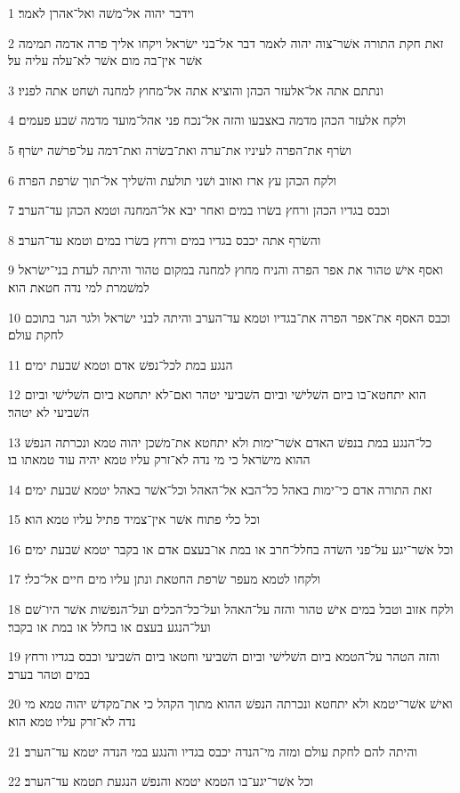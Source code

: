 \par 1 וידבר יהוה אל־משׁה ואל־אהרן לאמר׃
\par 2 זאת חקת התורה אשׁר־צוה יהוה לאמר דבר אל־בני ישׂראל ויקחו אליך פרה אדמה תמימה אשׁר אין־בה מום אשׁר לא־עלה עליה על׃
\par 3 ונתתם אתה אל־אלעזר הכהן והוציא אתה אל־מחוץ למחנה ושׁחט אתה לפניו׃
\par 4 ולקח אלעזר הכהן מדמה באצבעו והזה אל־נכח פני אהל־מועד מדמה שׁבע פעמים׃
\par 5 ושׂרף את־הפרה לעיניו את־ערה ואת־בשׂרה ואת־דמה על־פרשׁה ישׂרף׃
\par 6 ולקח הכהן עץ ארז ואזוב ושׁני תולעת והשׁליך אל־תוך שׂרפת הפרה׃
\par 7 וכבס בגדיו הכהן ורחץ בשׂרו במים ואחר יבא אל־המחנה וטמא הכהן עד־הערב׃
\par 8 והשׂרף אתה יכבס בגדיו במים ורחץ בשׂרו במים וטמא עד־הערב׃
\par 9 ואסף אישׁ טהור את אפר הפרה והניח מחוץ למחנה במקום טהור והיתה לעדת בני־ישׂראל למשׁמרת למי נדה חטאת הוא׃
\par 10 וכבס האסף את־אפר הפרה את־בגדיו וטמא עד־הערב והיתה לבני ישׂראל ולגר הגר בתוכם לחקת עולם׃
\par 11 הנגע במת לכל־נפשׁ אדם וטמא שׁבעת ימים׃
\par 12 הוא יתחטא־בו ביום השׁלישׁי וביום השׁביעי יטהר ואם־לא יתחטא ביום השׁלישׁי וביום השׁביעי לא יטהר׃
\par 13 כל־הנגע במת בנפשׁ האדם אשׁר־ימות ולא יתחטא את־משׁכן יהוה טמא ונכרתה הנפשׁ ההוא מישׂראל כי מי נדה לא־זרק עליו טמא יהיה עוד טמאתו בו׃
\par 14 זאת התורה אדם כי־ימות באהל כל־הבא אל־האהל וכל־אשׁר באהל יטמא שׁבעת ימים׃
\par 15 וכל כלי פתוח אשׁר אין־צמיד פתיל עליו טמא הוא׃
\par 16 וכל אשׁר־יגע על־פני השׂדה בחלל־חרב או במת או־בעצם אדם או בקבר יטמא שׁבעת ימים׃
\par 17 ולקחו לטמא מעפר שׂרפת החטאת ונתן עליו מים חיים אל־כלי׃
\par 18 ולקח אזוב וטבל במים אישׁ טהור והזה על־האהל ועל־כל־הכלים ועל־הנפשׁות אשׁר היו־שׁם ועל־הנגע בעצם או בחלל או במת או בקבר׃
\par 19 והזה הטהר על־הטמא ביום השׁלישׁי וביום השׁביעי וחטאו ביום השׁביעי וכבס בגדיו ורחץ במים וטהר בערב׃
\par 20 ואישׁ אשׁר־יטמא ולא יתחטא ונכרתה הנפשׁ ההוא מתוך הקהל כי את־מקדשׁ יהוה טמא מי נדה לא־זרק עליו טמא הוא׃
\par 21 והיתה להם לחקת עולם ומזה מי־הנדה יכבס בגדיו והנגע במי הנדה יטמא עד־הערב׃
\par 22 וכל אשׁר־יגע־בו הטמא יטמא והנפשׁ הנגעת תטמא עד־הערב׃

